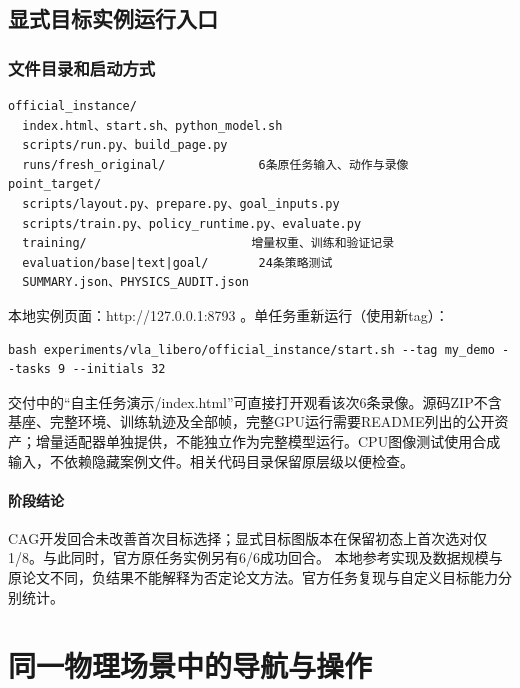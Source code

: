 \subsection{显式目标实例运行入口}\label{s14-detail-18}

\subsubsection{文件目录和启动方式}\label{s14-detail-19}

\begin{Verbatim}[breaklines=true,breakanywhere=true,fontsize=\footnotesize]
official_instance/
  index.html、start.sh、python_model.sh
  scripts/run.py、build_page.py
  runs/fresh_original/             6条原任务输入、动作与录像
point_target/
  scripts/layout.py、prepare.py、goal_inputs.py
  scripts/train.py、policy_runtime.py、evaluate.py
  training/                       增量权重、训练和验证记录
  evaluation/base|text|goal/       24条策略测试
  SUMMARY.json、PHYSICS_AUDIT.json
\end{Verbatim}

本地实例页面：http://127.0.0.1:8793 。单任务重新运行（使用新tag）：

\begin{Verbatim}[breaklines=true,breakanywhere=true,fontsize=\footnotesize]
bash experiments/vla_libero/official_instance/start.sh --tag my_demo --tasks 9 --initials 32
\end{Verbatim}

交付中的``自主任务演示/index.html''可直接打开观看该次6条录像。源码ZIP不含基座、完整环境、训练轨迹及全部帧，完整GPU运行需要README列出的公开资产；增量适配器单独提供，不能独立作为完整模型运行。CPU图像测试使用合成输入，不依赖隐藏案例文件。相关代码目录保留原层级以便检查。


\paragraph{阶段结论}CAG开发回合未改善首次目标选择；显式目标图版本在保留初态上首次选对仅1/8。与此同时，官方原任务实例另有6/6成功回合。 本地参考实现及数据规模与原论文不同，负结果不能解释为否定论文方法。官方任务复现与自定义目标能力分别统计。


\FloatBarrier

\section{同一物理场景中的导航与操作}

